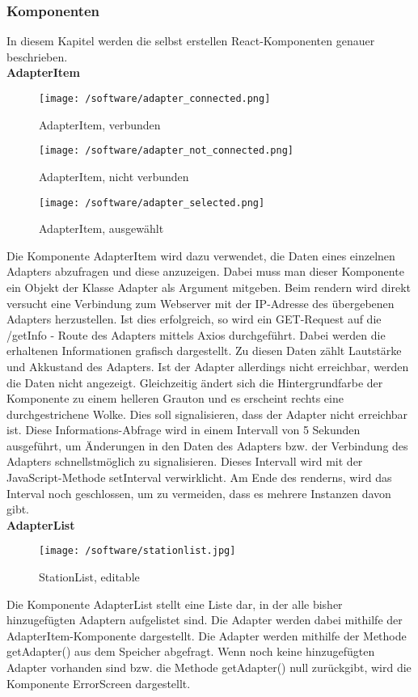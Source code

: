 \documentclass[]{article}
\begin{document}
\subsubsection{Komponenten}
In diesem Kapitel werden die selbst erstellen React-Komponenten genauer beschrieben. \newline \\
\textbf{AdapterItem} \\
\begin{figure}[H]
\texttt{[image: /software/adapter\_connected.png]}
\caption{AdapterItem, verbunden}
\texttt{[image: /software/adapter\_not\_connected.png]}
\caption{AdapterItem, nicht verbunden}
\texttt{[image: /software/adapter\_selected.png]}
\caption{AdapterItem, ausgewählt}
\end{figure}
Die Komponente AdapterItem wird dazu verwendet, die Daten eines einzelnen Adapters abzufragen und diese anzuzeigen. Dabei muss man dieser Komponente ein Objekt der Klasse Adapter als Argument mitgeben. Beim rendern wird direkt versucht eine Verbindung zum Webserver mit der IP-Adresse des übergebenen Adapters herzustellen. Ist dies erfolgreich, so wird ein GET-Request auf die /getInfo - Route des Adapters mittels Axios durchgeführt. Dabei werden die erhaltenen Informationen grafisch dargestellt. Zu diesen Daten zählt Lautstärke und Akkustand des Adapters. Ist der Adapter allerdings nicht erreichbar, werden die Daten nicht angezeigt. Gleichzeitig ändert sich die Hintergrundfarbe der Komponente zu einem helleren Grauton und es erscheint rechts eine durchgestrichene Wolke. Dies soll signalisieren, dass der Adapter nicht erreichbar ist. Diese Informations-Abfrage wird in einem Intervall von 5 Sekunden ausgeführt, um Änderungen in den Daten des Adapters bzw. der Verbindung des Adapters schnellstmöglich zu signalisieren. Dieses Intervall wird mit der JavaScript-Methode setInterval verwirklicht. Am Ende des renderns, wird das Interval noch geschlossen, um zu vermeiden, dass es mehrere Instanzen davon gibt. \newline \\
\textbf{AdapterList} \\
\begin{figure}[H]
\texttt{[image: /software/stationlist.jpg]}
\caption{StationList, editable}
\end{figure}
Die Komponente AdapterList stellt eine Liste dar, in der alle bisher hinzugefügten Adaptern aufgelistet sind. Die Adapter werden dabei mithilfe der AdapterItem-Komponente dargestellt. Die Adapter werden mithilfe der Methode getAdapter() aus dem Speicher abgefragt. Wenn noch keine hinzugefügten Adapter vorhanden sind bzw. die Methode getAdapter() null zurückgibt, wird die Komponente ErrorScreen dargestellt. \newline \\
\end{document}
